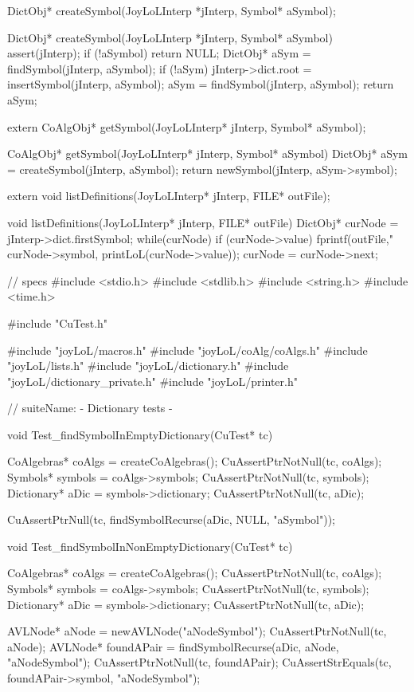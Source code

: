 \startTestSuite[createSymbol]

\startCHeader
DictObj* createSymbol(JoyLoLInterp *jInterp, Symbol* aSymbol);
\stopCHeader

\startCCode
DictObj* createSymbol(JoyLoLInterp *jInterp, Symbol* aSymbol) {
  assert(jInterp);
  if (!aSymbol) return NULL;
  DictObj* aSym = findSymbol(jInterp, aSymbol);
  if (!aSym) {
    jInterp->dict.root = insertSymbol(jInterp, aSymbol);
    aSym = findSymbol(jInterp, aSymbol);
  }
  return aSym;
}
\stopCCode
\stopTestSuite

\startCHeader
extern CoAlgObj* getSymbol(JoyLoLInterp* jInterp,
                           Symbol* aSymbol);
\stopCHeader

\startCCode
CoAlgObj* getSymbol(JoyLoLInterp* jInterp,
                    Symbol* aSymbol) {
  DictObj* aSym = createSymbol(jInterp, aSymbol);
  return newSymbol(jInterp, aSym->symbol);
}
\stopCCode

\startCHeader
extern void listDefinitions(JoyLoLInterp* jInterp, FILE* outFile);
\stopCHeader

\startCCode
void listDefinitions(JoyLoLInterp* jInterp, FILE* outFile) {
  DictObj* curNode = jInterp->dict.firstSymbol;
  while(curNode) {
    if (curNode->value) {
      fprintf(outFile,"%
              curNode->symbol, printLoL(curNode->value));
    }
    curNode = curNode->next;
  }
}
\stopCCode

\starttyping
// specs
#include <stdio.h>
#include <stdlib.h>
#include <string.h>
#include <time.h>

#include "CuTest.h"

#include "joyLoL/macros.h"
#include "joyLoL/coAlg/coAlgs.h"
#include "joyLoL/lists.h"
#include "joyLoL/dictionary.h"
#include "joyLoL/dictionary_private.h"
#include "joyLoL/printer.h"

// suiteName: - Dictionary tests -

void Test_findSymbolInEmptyDictionary(CuTest* tc) {
  CoAlgebras* coAlgs = createCoAlgebras();
  CuAssertPtrNotNull(tc, coAlgs);
  Symbols* symbols = coAlgs->symbols;
  CuAssertPtrNotNull(tc, symbols);
  Dictionary* aDic = symbols->dictionary;
  CuAssertPtrNotNull(tc, aDic);

  CuAssertPtrNull(tc, findSymbolRecurse(aDic, NULL, "aSymbol"));
}

void Test_findSymbolInNonEmptyDictionary(CuTest* tc) {
  CoAlgebras* coAlgs = createCoAlgebras();
  CuAssertPtrNotNull(tc, coAlgs);
  Symbols* symbols = coAlgs->symbols;
  CuAssertPtrNotNull(tc, symbols);
  Dictionary* aDic = symbols->dictionary;
  CuAssertPtrNotNull(tc, aDic);

  AVLNode* aNode = newAVLNode("aNodeSymbol");
  CuAssertPtrNotNull(tc, aNode);
  AVLNode* foundAPair = findSymbolRecurse(aDic, aNode, "aNodeSymbol");
  CuAssertPtrNotNull(tc, foundAPair);
  CuAssertStrEquals(tc, foundAPair->symbol, "aNodeSymbol");
}


